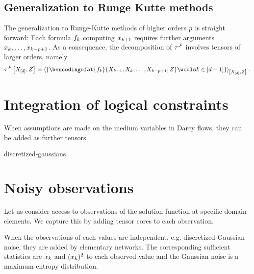 \documentclass[aps,onecolumn,nofootinbib,pra]{article}
\begin{document}
    \subsection{Generalization to Runge Kutte methods}

    The generalization to Runge-Kutte methods of higher orders $p$ is straight forward:
    Each formula $f_{k}$ computing $x_{k+1}$ requires further arguments $x_{k},\ldots,x_{k-p+1}$.
    As a consequence, the decomposition of $\tau^{\mathcal{F}}$ involves tensors of larger orders, namely
    \begin{align*}
        \hypercoreofat{\mathcal{F}}{\shortcatvariables,\thirdcatvariable}
        = \contractionof{
            \{\bencodingofat{\formulaof{\catenumerator}}{\catvariableof{\catenumerator+1},\catvariableof{\catenumerator},\ldots,\catvariableof{\catenumerator-\seccatorder+1},\thirdcatvariable}
            \wcols \catenumerator\in[\catorder-1]\}
        }{\shortcatvariables,\thirdcatvariable} \, .
    \end{align*}


    \section{Integration of logical constraints}


    \begin{example}
        When assumptions are made on the medium variables in Darcy flows, they can be added as further tensors.
    \end{example}

    {discretized-gaussians}


    \section{Noisy observations}

    Let us consider access to observations of the solution function at specific domain elements.
    We capture this by adding tensor cores to each observation.

    When the observations of each values are independent, e.g. discretized Gaussian noise, they are added by elementary networks.
    The corresponding sufficient statistics are $x_{k}$ and $(x_{k})^2$ to each observed value and the Gaussian noise is a maximum entropy distribution.
\end{document}
